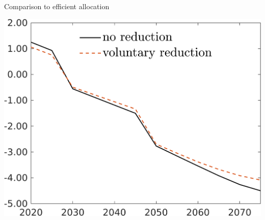 \documentclass[11pt,aspectratio=169]{beamer}
\begin{document}
\begin{frame}{Comparison to efficient allocation}
\begin{minipage}[]{0.32\textwidth}
\end{minipage}
\begin{minipage}[]{0.32\textwidth}
	\includegraphics[width=1\textwidth]{../codding_model/own_basedOnFried/optimalPol_elastS_DisuSci/figures/all_1705/hh_CompEffOPT_T_NoTaus_spillover0_sep1_BN1_ineq0_redCOMP_etaa0.79_lgd1.png}
\end{minipage}
\end{frame}

\end{document}
